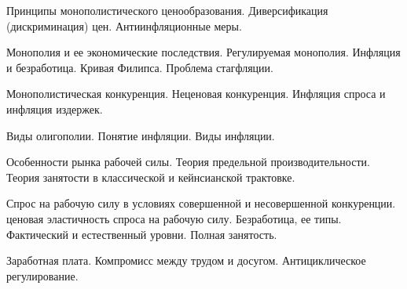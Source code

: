 \shapkFull
\setcounter{zad}{0}

\z 	Принципы монополистического ценообразования.  Диверсификация  (дискриминация) цен.
 \medskip
\z 	Антиинфляционные меры.
 \medskip

\newpage


\shapkFull
\setcounter{zad}{0}

\z 	Монополия и ее экономические последствия.  Регулируемая монополия.
 \medskip
\z 	Инфляция и безработица.  Кривая Филипса. Проблема стагфляции.
 \medskip

\newpage


\shapkFull
\setcounter{zad}{0}

\z 	Монополистическая конкуренция.  Неценовая конкуренция.
 \medskip
\z 	Инфляция спроса и инфляция издержек.
 \medskip

\newpage


\shapkFull
\setcounter{zad}{0}

\z 	Виды олигополии.
 \medskip
\z 	Понятие инфляции. Виды инфляции.
 \medskip

\newpage


\shapkFull
\setcounter{zad}{0}

\z 	Особенности рынка рабочей силы.  Теория предельной производительности.
 \medskip
\z 	Теория занятости в классической и кейнсианской трактовке. 
 \medskip

\newpage


\shapkFull
\setcounter{zad}{0}

\z 	Спрос на рабочую силу в условиях совершенной и несовершенной конкуренции. ценовая эластичность спроса на рабочую силу.
 \medskip
\z 	Безработица, ее типы. Фактический и естественный уровни. Полная занятость.
 \medskip

\newpage


\shapkFull
\setcounter{zad}{0}

\z 	Заработная плата. Компромисс между трудом и досугом.
 \medskip
\z 	Антициклическое регулирование.
 \medskip

\newpage


\shapkFull
\setcounter{zad}{0}

